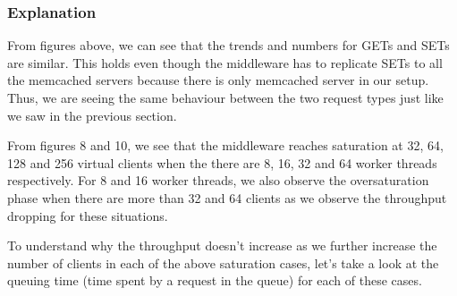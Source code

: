 \documentclass[11pt,a4paper]{article}
\newcommand\instructions[1]{\textcolor{blue}{Instructions: #1}}
\begin{document}
\subsubsection{Explanation}

From figures above, we can see that the trends and numbers for GETs and SETs are similar. This holds even though the middleware has to replicate SETs to all the memcached servers because there is only memcached server in our setup. Thus, we are seeing the same behaviour between the two request types just like we saw in the previous section.

From figures 8 and 10, we see that the middleware reaches saturation at 32, 64, 128 and 256 virtual clients when the there are 8, 16, 32 and 64 worker threads respectively. For 8 and 16 worker threads, we also observe the oversaturation phase when there are more than 32 and 64 clients as we observe the throughput dropping for these situations.

To understand why the throughput doesn't increase as we further increase the number of clients in each of the above saturation cases, let's take a look at the queuing time (time spent by a request in the queue) for each of these cases.
\end{document}

